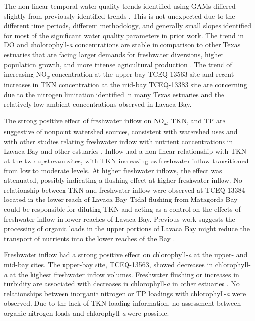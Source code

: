 \documentclass[sn-basic,referee,lineno,pdflatex]{sn-jnl}
\begin{document}
The non-linear temporal water quality trends identified using GAMs
differed slightly from previously identified trends
\citep{bugica_water_2020}. This is not unexpected due to the different
time periods, different methodology, and generally small slopes
identified for most of the significant water quality parameters in prior
work. The trend in DO and cholorophyll-\emph{a} concentrations are
stable in comparison to other Texas estuaries that are facing larger
demands for freshwater diversions, higher population growth, and more
intense agricultural production
\citep{wetzWaterQualityDynamics2016, bugica_water_2020}. The trend of
increasing NO\textsubscript{\emph{x}} concentration at the upper-bay
TCEQ-13563 site and recent increases in TKN concentration at the mid-bay
TCEQ-13383 site are concerning due to the nitrogen limitation identified
in many Texas estuaries
\citep{gardnerNitrogenFixationDissimilatory2006, houTransformationFateNitrate2012, doradoUnderstandingInteractionsFreshwater2015, paudelRelationshipSuspendedSolids2019, wetz_exceptionally_2017}
and the relatively low ambient concentrations observed in Lavaca Bay.

The strong positive effect of freshwater inflow on
NO\textsubscript{\emph{x}}, TKN, and TP are suggestive of nonpoint
watershed sources, consistent with watershed uses and with other studies
relating freshwater inflow with nutrient concentrations in Lavaca Bay
and other estuaries
\citep{russell_effect_2006, caffreyHighNutrientPulses2007, peierlsNonmonotonicResponsesPhytoplankton2012, palmerImpactsDroughtsLow2015, ciraPhytoplanktonDynamicsLowinflow2021}.
Inflow had a non-linear relationship with TKN at the two upstream sites,
with TKN increasing as freshwater inflow transitioned from low to
moderate levels. At higher freshwater inflows, the effect was
attenuated, possibly indicating a flushing effect at higher freshwater
inflow. No relationship between TKN and freshwater inflow were observed
at TCEQ-13384 located in the lower reach of Lavaca Bay. Tidal flushing
from Matagorda Bay could be responsible for diluting TKN and acting as a
control on the effects of freshwater inflow in lower reaches of Lavaca
Bay. Previous work suggests the processing of organic loads in the upper
portions of Lavaca Bay might reduce the transport of nutrients into the
lower reaches of the Bay \citep{russell_effect_2006}.

Freshwater inflow had a strong positive effect on chlorophyll-\emph{a}
at the upper- and mid-bay sites. The upper-bay site, TCEQ-13563, showed
decreases in chlorophyll-\emph{a} at the highest freshwater inflow
volumes. Freshwater flushing or increases in turbidity are associated
with decreases in chlorophyll-\emph{a} in other estuaries
\citep{peierlsNonmonotonicResponsesPhytoplankton2012, cloernPhytoplanktonPrimaryProduction2014}.
No relationships between inorganic nitrogen or TP loadings with
chlorophyll-\emph{a} were observed. Due to the lack of TKN loading
information, no assessment between organic nitrogen loads and
chlorophyll-\emph{a} were possible.
\end{document}
